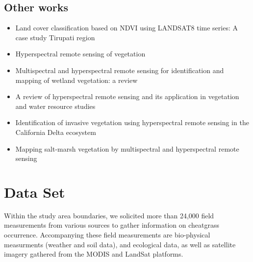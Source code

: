 \def\year{2017}\relax \documentclass[letterpaper]{article}
\begin{document}
\subsection{Other works}
\begin{itemize}
\item Land cover classification based on NDVI using LANDSAT8 time series: A case study Tirupati region \cite{jeevalakshmi2016land}
\item Hyperspectral remote sensing of vegetation \cite{thenkabail2016hyperspectral}
\item Multispectral and hyperspectral remote sensing for identification and mapping of wetland vegetation: a review \cite{adam2010multispectral}
\item A review of hyperspectral remote sensing and its application in vegetation and water resource studies \cite{govender2007review}
\item Identification of invasive vegetation using hyperspectral remote sensing in the California Delta ecosystem \cite{hestir2008identification}
\item Mapping salt-marsh vegetation by multispectral and hyperspectral remote sensing \cite{belluco2006mapping}
\end{itemize}

\section{Data Set}
Within the study area boundaries, we solicited more than 24,000 field measurements from various sources to gather information on cheatgrass occurrence.
Accompanying these field measurements are bio-physical measurments (weather and soil data), and ecological data, as well as satellite imagery gathered from the MODIS and LandSat platforms.  
\end{document}
